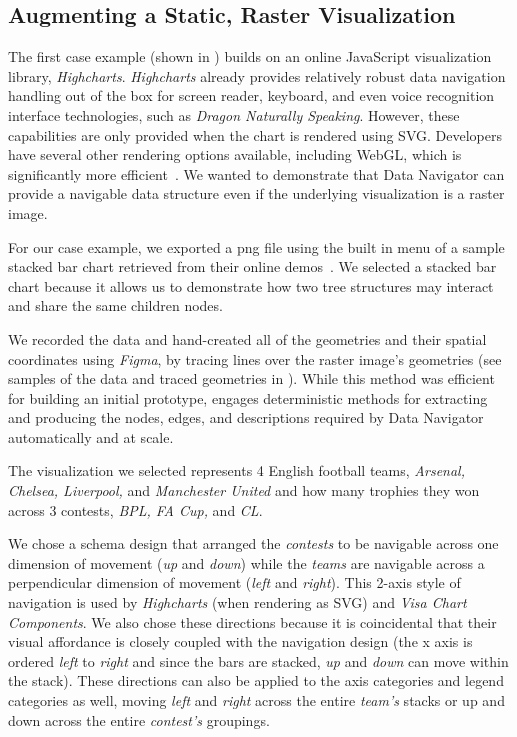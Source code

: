 \documentclass[12pt]{cmuthesis}
\begin{document}
\subsection{Augmenting a Static, Raster Visualization}
\label{section:raster}
The first case example (shown in ) builds on an online JavaScript visualization library, \textit{Highcharts}. \textit{Highcharts} already provides relatively robust data navigation handling out of the box for screen reader, keyboard, and even voice recognition interface technologies, such as \textit{Dragon Naturally Speaking}. However, these capabilities are only provided when the chart is rendered using SVG. Developers have several other rendering options available, including WebGL, which is significantly more efficient~\cite{HighsoftBoost}. We wanted to demonstrate that Data Navigator can provide a navigable data structure even if the underlying visualization is a raster image.

For our case example, we exported a png file using the built in menu of a sample stacked bar chart retrieved from their online demos~\cite{HighchartsStacked}. We selected a stacked bar chart because it allows us to demonstrate how two tree structures may interact and share the same children nodes.

We recorded the data and hand-created all of the geometries and their spatial coordinates using \textit{Figma}, by tracing lines over the raster image's geometries (see samples of the data and traced geometries in ). While this method was efficient for building an initial prototype,  engages deterministic methods for extracting and producing the nodes, edges, and descriptions required by Data Navigator automatically and at scale.

The visualization we selected represents 4 English football teams, \textit{Arsenal, Chelsea, Liverpool,} and \textit{Manchester United} and how many trophies they won across 3 contests, \textit{BPL, FA Cup,} and \textit{CL}.

We chose a schema design that arranged the \textit{contests} to be navigable across one dimension of movement (\textit{up} and \textit{down}) while the \textit{teams} are navigable across a perpendicular dimension of movement (\textit{left} and \textit{right}). This 2-axis style of navigation is used by \textit{Highcharts} (when rendering as SVG) and \textit{Visa Chart Components}. We also chose these directions because it is coincidental that their visual affordance is closely coupled with the navigation design (the x axis is ordered \textit{left} to \textit{right} and since the bars are stacked, \textit{up} and \textit{down} can move within the stack). These directions can also be applied to the axis categories and legend categories as well, moving \textit{left} and \textit{right} across the entire \textit{team's} stacks or up and down across the entire \textit{contest's} groupings.
\end{document}
